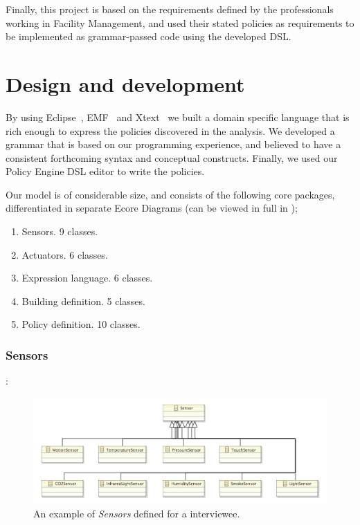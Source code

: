\documentclass{llncs}
\begin{document}
Finally, this project is based on the requirements defined by the professionals working in Facility Management, and used their stated policies as requirements to be implemented as grammar-passed code using the developed DSL.

\section{Design and development}\label{sec:dsldesign}
By using Eclipse~\cite{eclipse}, EMF~\cite{emf} and Xtext~\cite{xtext} we built a domain specific language that is rich enough to express the policies discovered in the analysis. We developed a grammar that is based on our programming experience, and believed to have a consistent forthcoming syntax and conceptual constructs. Finally, we used our Policy Engine DSL editor to write the policies.

Our model is of considerable size, and consists of the following core packages, differentiated in separate Ecore Diagrams (can be viewed in full in );

\begin{enumerate}
	\item Sensors. 9 classes.
	\item Actuators. 6 classes.
	\item Expression language. 6 classes.
	\item Building definition. 5 classes.
	\item Policy definition. 10 classes.
\end{enumerate}

\subsubsection{Sensors}:
\begin{figure}
	\centering
    \includegraphics[scale=0.7]{ecore-sensors.png} 
	\caption{An example of \textit{Sensors} defined for a interviewee.}
	\label{fig:ecore-sensors}
\end{figure}
\end{document}
